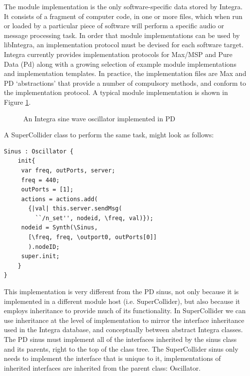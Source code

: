 \documentclass[10pt,journal,final]{IEEEtran}
\begin{document}
The module implementation is the only software-specific data stored by Integra. It consists of a fragment of computer code, in one or more files, which when run or loaded by a particular piece of software will perform a specific audio or message processing task. In order that module implementations can be used by libIntegra, an implementation protocol must be devised for each software target. Integra currently provides implementation protocols for Max/MSP and Pure Data (Pd) along with a growing selection of example module implementations and implementation templates. In practice, the implementation files are Max and PD `abstractions' that provide a number of compulsory methods, and conform to the implementation protocol. A typical module implementation is shown in Figure {\ref{fig:sinus}}. 

\begin{figure}[b]
\centerline{}
\caption{An Integra sine wave oscillator implemented in PD}
\label{fig:sinus}
\end{figure}

A SuperCollider class to perform the same task, might look as follows:
{\small
\begin{verbatim}
Sinus : Oscillator {
    init{
     var freq, outPorts, server;
     freq = 440;
     outPorts = [1];
     actions = actions.add(
       {|val| this.server.sendMsg(
         ``/n_set'', nodeid, \freq, val)});
     nodeid = Synth(\Sinus, 
       [\freq, freq, \outport0, outPorts[0]]
       ).nodeID;
     super.init;
    }
}
\end{verbatim}}
This implementation is very different from the PD sinus, not only because it is implemented in a different module host (i.e. SuperCollider), but also because it employs inheritance to provide much of its functionality. In SuperCollider we can use inheritance at the level of implementation to mirror the interface inheritance used in the Integra database, and conceptually between abstract Integra classes. The PD sinus must implement all of the interfaces inherited by the sinus class and its parents, right to the top of the class tree. The SuperCollider sinus only needs to implement the interface that is unique to it, implementations of inherited interfaces are inherited from the parent class: Oscillator. 
\end{document}
